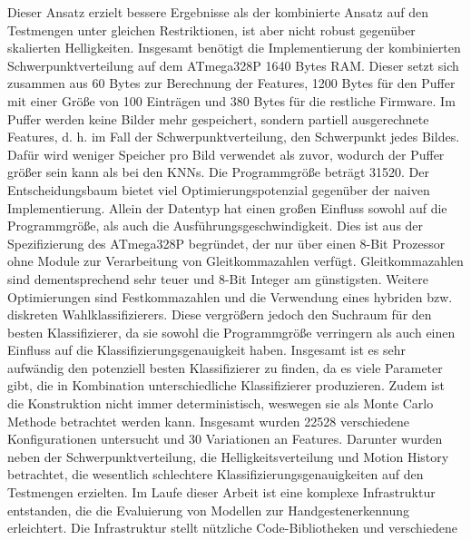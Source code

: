 Dieser Ansatz erzielt bessere Ergebnisse als der kombinierte Ansatz auf den Testmengen unter gleichen Restriktionen, ist aber nicht robust gegenüber skalierten Helligkeiten.
\newline
\newline
Insgesamt benötigt die Implementierung der kombinierten Schwerpunktverteilung auf dem ATmega328P 1640 Bytes RAM. Dieser setzt sich zusammen aus 60 Bytes zur Berechnung der Features, 1200 Bytes für den Puffer
mit einer Größe von 100 Einträgen
und 380 Bytes für die restliche Firmware. Im Puffer werden keine Bilder mehr gespeichert, sondern partiell ausgerechnete Features, d. h. im Fall der Schwerpunktverteilung, den Schwerpunkt jedes Bildes.
Dafür wird weniger Speicher pro Bild verwendet als zuvor, wodurch der Puffer größer sein kann als bei den KNNs. Die Programmgröße beträgt 31520.
\newline
\newline
Der Entscheidungsbaum bietet viel Optimierungspotenzial gegenüber der naiven Implementierung. Allein der Datentyp hat einen großen Einfluss sowohl auf die Programmgröße, als auch die Ausführungsgeschwindigkeit.
Dies ist aus der Spezifizierung des ATmega328P begründet, der nur über einen 8-Bit Prozessor ohne Module zur Verarbeitung von Gleitkommazahlen verfügt. Gleitkommazahlen sind dementsprechend sehr teuer und 8-Bit
Integer am günstigsten. Weitere Optimierungen sind Festkommazahlen und die Verwendung eines hybriden bzw. diskreten Wahlklassifizierers. Diese vergrößern jedoch den Suchraum für den besten Klassifizierer, da sie
sowohl die Programmgröße verringern als auch einen Einfluss auf die Klassifizierungsgenauigkeit haben.
\newline
\newline
Insgesamt ist es sehr aufwändig den potenziell besten Klassifizierer zu finden, da es viele Parameter gibt, die in Kombination unterschiedliche Klassifizierer produzieren. Zudem ist die
Konstruktion nicht immer deterministisch, weswegen sie als Monte Carlo Methode betrachtet werden kann. Insgesamt wurden 22528 verschiedene Konfigurationen untersucht und 30 Variationen an Features.
Darunter wurden neben der Schwerpunktverteilung, die Helligkeitsverteilung und Motion History betrachtet, die wesentlich schlechtere Klassifizierungsgenauigkeiten auf den Testmengen erzielten.
\newline
\newline
Im Laufe dieser Arbeit ist eine komplexe Infrastruktur entstanden, die die Evaluierung von Modellen zur Handgestenerkennung erleichtert. Die Infrastruktur stellt nützliche Code-Bibliotheken und verschiedene
